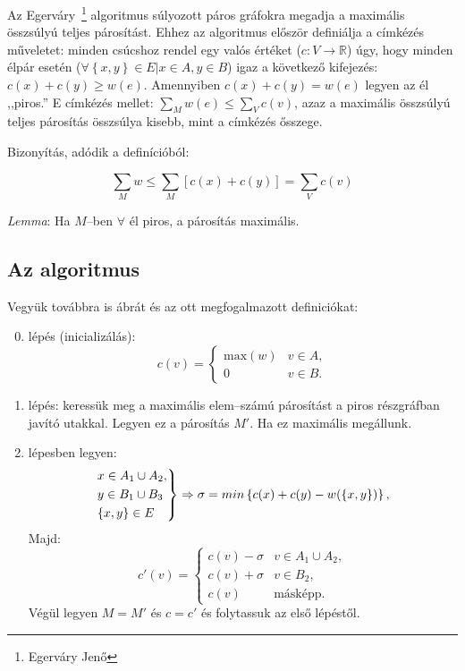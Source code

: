 Az Egerváry~\footnote{Egerváry Jenő} algoritmus súlyozott páros gráfokra megadja
a maximális összsúlyú teljes párosítást. Ehhez az algoritmus először definiálja
a címkézés műveletet: minden csúcshoz rendel egy valós értéket ($c:V \rightarrow
	\mathbb{R}$) úgy, hogy minden élpár esetén ($\forall \left\{x,y\right\} \in E |
	x \in A, y \in B$) igaz a következő kifejezés: $c(x)+c(y) \geq w(e)$. Amennyiben
$c(x)+c(y)=w(e)$ legyen az él ,,piros.'' E címkézés mellet: $\sum_Mw(e) \leq
	\sum_Vc(v)$, azaz a maximális összsúlyú teljes párosítás összsúlya kisebb, mint
a címkézés ősszege.

Bizonyítás, adódik a definícióból:

\begin{displaymath}
	\sum_M{w} \leq \sum_M{\left[c(x)+c(y)\right]} = \sum_V{c(v)}
\end{displaymath}

\emph{Lemma}: Ha $M$--ben $\forall$ él piros, a párosítás maximális.

\subsection{Az algoritmus}

Vegyük továbbra is  ábrát és az ott megfogalmazott definiciókat:

\begin{enumerate}
	\setcounter{enumi}{-1}
	\item lépés (inicializálás):   \begin{displaymath}
		      c(v)=\begin{cases}
			      \mbox{max}(w) & v \in A, \\
			      0             & v \in B.
		      \end{cases}
	      \end{displaymath}
	\item lépés: keressük meg a maximális elem--számú párosítást a piros részgráfban
	      javító utakkal.
	      Legyen ez a párosítás $M'$. Ha ez maximális megállunk.
	\item lépesben legyen:
	      \begin{displaymath}
		      \begin{rcases}
			      x \in A_1 \cup A_2, \\
			      y \in B_1 \cup B_3  \\
			      \{x,y\} \in E
		      \end{rcases}
		      \Rightarrow \sigma= min\left\{c(x) + c(y) - w(\left\{x,y\right\}) \right\},
	      \end{displaymath}
	      Majd: \begin{displaymath}
		      c'(v)=\begin{cases}
			      c(v)-\sigma & v \in A_1 \cup A_2, \\
			      c(v)+\sigma & v \in B_2,          \\
			      c(v)        & \mbox{másképp.}
		      \end{cases}
	      \end{displaymath}
	      Végül legyen $M=M'$ és $c=c'$ és folytassuk az első lépéstől.
\end{enumerate}

